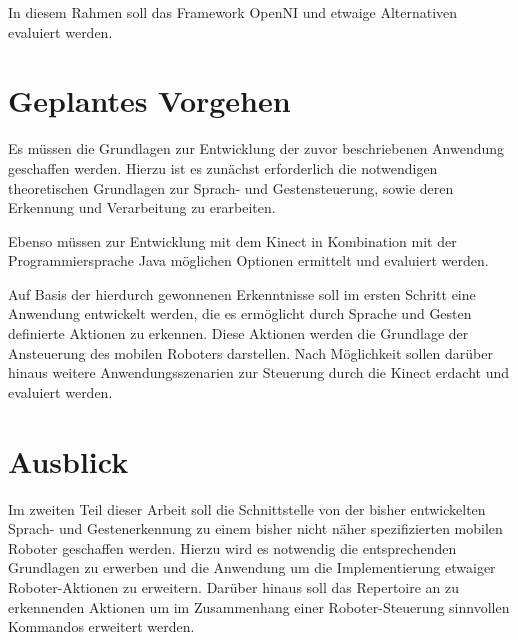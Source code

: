 In diesem Rahmen soll das Framework OpenNI und etwaige Alternativen evaluiert werden.


\section{Geplantes Vorgehen}


%

Es m\"ussen die Grundlagen zur Entwicklung der zuvor beschriebenen Anwendung geschaffen werden. 
Hierzu ist es zun\"achst erforderlich die notwendigen theoretischen Grundlagen zur Sprach- und Gestensteuerung, sowie deren Erkennung und Verarbeitung zu erarbeiten.

Ebenso m\"ussen  zur Entwicklung mit dem Kinect  in Kombination mit der Programmiersprache Java m\"oglichen Optionen ermittelt und evaluiert werden.

Auf Basis der hierdurch gewonnenen Erkenntnisse soll im ersten Schritt eine Anwendung entwickelt werden, die es erm\"oglicht durch Sprache und Gesten definierte Aktionen zu erkennen. 
Diese Aktionen werden die Grundlage der Ansteuerung des mobilen Roboters darstellen.
\newline
Nach M\"oglichkeit sollen dar\"uber hinaus weitere Anwendungsszenarien zur Steuerung durch die Kinect erdacht und evaluiert werden.

\section{Ausblick}


Im zweiten Teil dieser Arbeit soll die Schnittstelle von der bisher entwickelten Sprach- und Gestenerkennung zu einem bisher nicht n\"aher spezifizierten mobilen Roboter geschaffen werden.
Hierzu wird es notwendig die entsprechenden Grundlagen zu erwerben und die Anwendung um die Implementierung etwaiger Roboter-Aktionen zu erweitern.
Dar\"uber hinaus soll das Repertoire an zu erkennenden Aktionen um im Zusammenhang einer Roboter-Steuerung sinnvollen Kommandos erweitert werden.